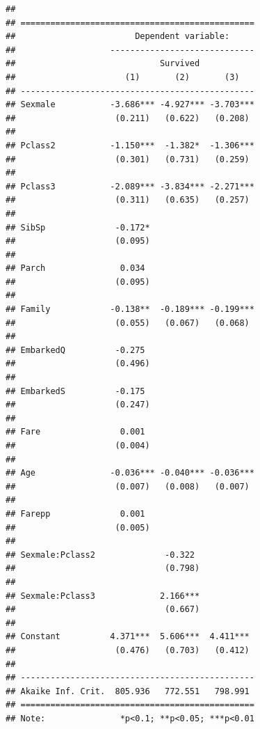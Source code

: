\documentclass[
]{article}
\begin{document}
\begin{verbatim}
## 
## ===============================================
##                        Dependent variable:     
##                   -----------------------------
##                             Survived           
##                      (1)       (2)       (3)   
## -----------------------------------------------
## Sexmale           -3.686*** -4.927*** -3.703***
##                    (0.211)   (0.622)   (0.208) 
##                                                
## Pclass2           -1.150***  -1.382*  -1.306***
##                    (0.301)   (0.731)   (0.259) 
##                                                
## Pclass3           -2.089*** -3.834*** -2.271***
##                    (0.311)   (0.635)   (0.257) 
##                                                
## SibSp              -0.172*                     
##                    (0.095)                     
##                                                
## Parch               0.034                      
##                    (0.095)                     
##                                                
## Family            -0.138**  -0.189*** -0.199***
##                    (0.055)   (0.067)   (0.068) 
##                                                
## EmbarkedQ          -0.275                      
##                    (0.496)                     
##                                                
## EmbarkedS          -0.175                      
##                    (0.247)                     
##                                                
## Fare                0.001                      
##                    (0.004)                     
##                                                
## Age               -0.036*** -0.040*** -0.036***
##                    (0.007)   (0.008)   (0.007) 
##                                                
## Farepp              0.001                      
##                    (0.005)                     
##                                                
## Sexmale:Pclass2              -0.322            
##                              (0.798)           
##                                                
## Sexmale:Pclass3             2.166***           
##                              (0.667)           
##                                                
## Constant          4.371***  5.606***  4.411*** 
##                    (0.476)   (0.703)   (0.412) 
##                                                
## -----------------------------------------------
## Akaike Inf. Crit.  805.936   772.551   798.991 
## ===============================================
## Note:               *p<0.1; **p<0.05; ***p<0.01
\end{verbatim}
\end{document}
